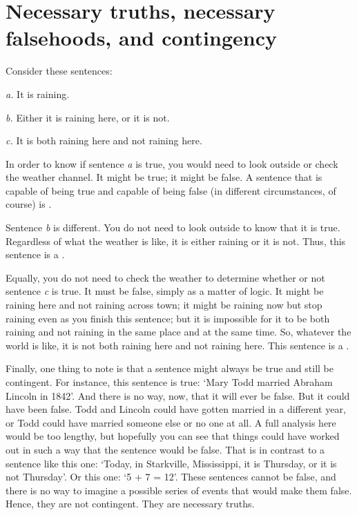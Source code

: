 \section[Necessary truths, falsehoods, and contingency]{Necessary truths, necessary falsehoods, and contingency}\label{s:nec-truth}

Consider these sentences:
	\begin{earg}
		\item[\textit{a.}] It is raining.
		\item[\textit{b.}] Either it is raining here, or it is not.
		\item[\textit{c.}] It is both raining here and not raining here.
	\end{earg}
In order to know if sentence \textit{a} is true, you would need to look outside or check the weather channel. It might be true; it might be false. A sentence that is capable of being true and capable of being false (in different circumstances, of course) is .

Sentence \textit{b} is different. You do not need to look outside to know that it is true. Regardless of what the weather is like, it is either raining or it is not. Thus, this sentence is a . 

Equally, you do not need to check the weather to determine whether or not sentence \textit{c} is true. It must be false, simply as a matter of logic. It might be raining here and not raining across town; it might be raining now but stop raining even as you finish this sentence; but it is impossible for it to be both raining and not raining in the same place and at the same time. So, whatever the world is like, it is not both raining here and not raining here. This sentence is a .

Finally, one thing to note is that a sentence might always be true and still be contingent. For instance, this sentence is true: `Mary Todd married Abraham Lincoln in 1842'. And there is no way, now, that it will ever be false. But it could have been false. Todd and Lincoln could have gotten married in a different  year, or Todd could have married someone else or no one at all. A full analysis here would be too lengthy, but hopefully you can see that things could have worked out in such a way that the sentence would be false. That is in contrast to a sentence like this one: `Today, in Starkville, Mississippi, it is Thursday, or it is not Thursday'. Or this one: `5 + 7 = 12'. These sentences cannot be false, and there is no way to imagine a possible series of events that would make them false. Hence, they are not contingent. They are necessary truths.    



